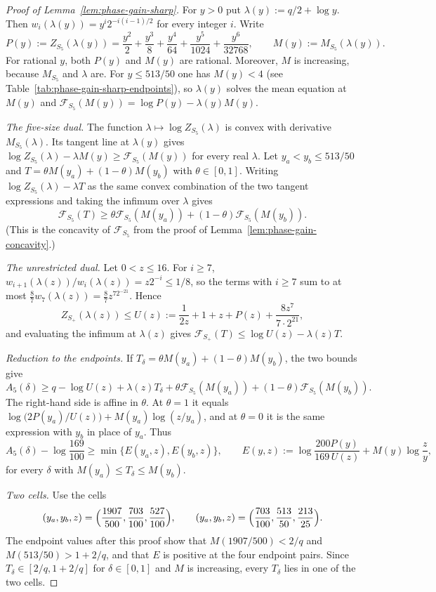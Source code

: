 \documentclass[a4paper,10pt,reqno]{amsart}
\numberwithin{equation}{section}
\theoremstyle{plain}
\theoremstyle{remark}
\begin{document}
\begin{proof}[Proof of Lemma~\ref{lem:phase-gain-sharp}]
For $y>0$ put $\lambda(y):=q/2+\log y$. Then
$w_i(\lambda(y))=y^i2^{-i(i-1)/2}$ for every integer $i$. Write
\[
 P(y):=Z_{S_5}(\lambda(y))
 =\frac{y^2}{2}+\frac{y^3}{8}+\frac{y^4}{64}+\frac{y^5}{1024}
  +\frac{y^6}{32768},
 \qquad
 M(y):=M_{S_5}(\lambda(y)).
\]
For rational $y$, both $P(y)$ and
$M(y)$ are rational. Moreover, $M$ is increasing, because $M_{S_5}$ and
$\lambda$ are. For $y\le513/50$ one has $M(y)<4$
(see Table~\ref{tab:phase-gain-sharp-endpoints}), so $\lambda(y)$ solves the
mean equation at $M(y)$ and
$\mathcal F_{S_5}(M(y))=\log P(y)-\lambda(y)M(y)$.

\emph{The five-size dual.} The function $\lambda\mapsto\log Z_{S_5}(\lambda)$
is convex with derivative $M_{S_5}(\lambda)$. Its tangent line at
$\lambda(y)$ gives
$\log Z_{S_5}(\lambda)-\lambda M(y)\ge\mathcal F_{S_5}(M(y))$ for every
real $\lambda$. Let $y_a<y_b\le513/50$ and $T=\theta M(y_a)+(1-\theta)M(y_b)$
with $\theta\in[0,1]$. Writing $\log Z_{S_5}(\lambda)-\lambda T$ as the same
convex combination of the two tangent expressions and taking the infimum
over $\lambda$ gives
\[
 \mathcal F_{S_5}(T)\ge\theta\mathcal F_{S_5}(M(y_a))
   +(1-\theta)\mathcal F_{S_5}(M(y_b)).
\]
(This is the concavity of $\mathcal F_{S_5}$ from the proof of
Lemma~\ref{lem:phase-gain-concavity}.)

\emph{The unrestricted dual.} Let $0<z\le16$. For $i\ge7$,
$w_{i+1}(\lambda(z))/w_i(\lambda(z))=z2^{-i}\le1/8$, so the terms with
$i\ge7$ sum to at most $\frac87w_7(\lambda(z))=\frac87z^72^{-21}$. Hence
\[
 Z_{S_+}(\lambda(z))\le U(z):=\frac1{2z}+1+z+P(z)+\frac{8z^7}{7\cdot2^{21}},
\]
and evaluating the infimum at $\lambda(z)$ gives
$\mathcal F_{S_+}(T)\le\log U(z)-\lambda(z)T$.

\emph{Reduction to the endpoints.} If
$T_\delta=\theta M(y_a)+(1-\theta)M(y_b)$, the two bounds give
\[
 A_5(\delta)\ge q-\log U(z)+\lambda(z)T_\delta
   +\theta\mathcal F_{S_5}(M(y_a))+(1-\theta)\mathcal F_{S_5}(M(y_b)).
\]
The right-hand side is affine in $\theta$. At $\theta=1$ it equals
$\log\bigl(2P(y_a)/U(z)\bigr)+M(y_a)\log(z/y_a)$, and at $\theta=0$ it is
the same expression with $y_b$ in place of $y_a$. Thus
\[
 A_5(\delta)-\log\frac{169}{100}\ge\min\{E(y_a,z),E(y_b,z)\},
 \qquad
 E(y,z):=\log\frac{200P(y)}{169\,U(z)}+M(y)\log\frac zy,
\]
for every $\delta$ with $M(y_a)\le T_\delta\le M(y_b)$.

\emph{Two cells.} Use the cells
\[
 (y_a,y_b,z)=\Bigl(\frac{1907}{500},\frac{703}{100},\frac{527}{100}\Bigr),
 \qquad
 (y_a,y_b,z)=\Bigl(\frac{703}{100},\frac{513}{50},\frac{213}{25}\Bigr).
\]
The endpoint values after this proof show that
$M(1907/500)<2/q$ and $M(513/50)>1+2/q$, and that $E$ is positive at the
four endpoint pairs. Since $T_\delta\in[2/q,1+2/q]$ for $\delta\in[0,1]$
and $M$ is increasing, every $T_\delta$ lies in one of the two cells.
\end{proof}
\end{document}
